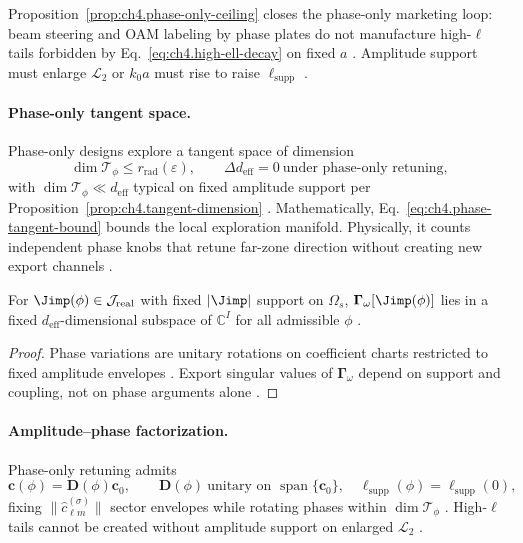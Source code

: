 Proposition~\ref{prop:ch4.phase-only-ceiling} closes the phase-only marketing loop: beam steering and OAM labeling by phase plates do not manufacture
high-\(\ell\) tails forbidden by Eq.~\eqref{eq:ch4.high-ell-decay} on fixed \(a\) \cite{hansen1988,jackson1999,harrington2001}. Amplitude support must
enlarge \(\mathcal{L}_{2}\) or \(k_{0}a\) must rise to raise \(\ell_{\mathrm{supp}}\) \cite{stratton1941,devaney2004}.

\paragraph{Phase-only tangent space.}
Phase-only designs explore a tangent space of dimension
\begin{equation}
\label{eq:ch4.phase-tangent-bound}
\dim\mathcal{T}_{\phi}\le r_{\mathrm{rad}}(\varepsilon),\qquad
\Delta d_{\mathrm{eff}}=0\ \text{under phase-only retuning},
\end{equation}
with \(\dim\mathcal{T}_{\phi}\ll d_{\mathrm{eff}}\) typical on fixed amplitude support per Proposition~\ref{prop:ch4.tangent-dimension}
\cite{stratton1941,harrington2001,devaney2004,hansen1988}. Mathematically, Eq.~\eqref{eq:ch4.phase-tangent-bound} bounds the local exploration manifold.
Physically, it counts independent phase knobs that retune far-zone direction without creating new export channels \cite{collin2001,jackson1999}.

\begin{theorem}
\label{thm:ch4.phase-manifold-rank}
For \(\Jimp(\phi)\in\mathcal{J}_{\mathrm{real}}\) with fixed \(|\Jimp|\) support on \(\Omega_{s}\),
\(\boldsymbol{\Gamma}_\omega[\Jimp(\phi)]\) lies in a fixed \(d_{\mathrm{eff}}\)-dimensional subspace of \(\mathbb{C}^{I}\) for all admissible \(\phi\)
\cite{stratton1941,harrington2001,devaney2004,hansen1988}.
\end{theorem}
\begin{proof}
Phase variations are unitary rotations on coefficient charts restricted to fixed amplitude envelopes \cite{harrington2001,stratton1941}. Export singular
values of \(\boldsymbol{\Gamma}_\omega\) depend on support and coupling, not on phase arguments alone \cite{hansen1988,devaney2004,jackson1999}.
\end{proof}

\paragraph{Amplitude--phase factorization.}
Phase-only retuning admits
\begin{equation}
\label{eq:ch4.phase-amplitude-factor}
\mathbf{c}(\phi)=\mathbf{D}(\phi)\mathbf{c}_{0},\qquad
\mathbf{D}(\phi)\ \text{unitary on }\operatorname{span}\{\mathbf{c}_{0}\},\quad
\ell_{\mathrm{supp}}(\phi)=\ell_{\mathrm{supp}}(0),
\end{equation}
fixing \(\|\widehat{c}_{\ell m}^{(\sigma)}\|\) sector envelopes while rotating phases within \(\dim\mathcal{T}_{\phi}\)
\cite{stratton1941,hansen1988,harrington2001,jackson1999}. High-\(\ell\) tails cannot be created without amplitude support on enlarged \(\mathcal{L}_{2}\)
\cite{devaney2004}.

